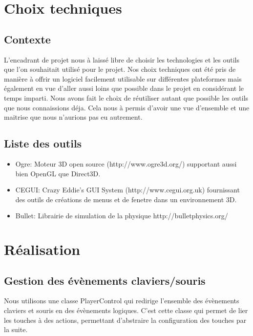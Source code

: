 \documentclass[frenchb,twoside]{EPURapport}
\begin{document}
    
    
\chapter{Choix techniques}
    \section{Contexte}
    L'encadrant de projet nous à laissé libre de choisir les technologies et
    les outils que l'on souhaitait utilisé pour le projet. Nos choix techniques
    ont été pris de manière à offrir un logiciel facilement utilisable sur
    différentes plateformes mais également en vue d'aller aussi loins que
    possible dans le projet en considérant le temps imparti. Nous avons fait le
    choix de réutiliser autant que possible les outils que nous connaissions
    déja. Cela nous à permis d'avoir une vue d'ensemble et une maitrise que
    nous n'aurions pas eu autrement.

    \section{Liste des outils}
    \begin{itemize}
        \item Ogre: Moteur 3D open source (http://www.ogre3d.org/) supportant aussi bien OpenGL que Direct3D. 
        \item CEGUI: Crazy Eddie's GUI System (http://www.cegui.org.uk) fournissant des outils de créations de menus et de fenetre dans un environnement 3D.
        \item Bullet: Librairie de simulation de la physique http://bulletphysics.org/
    \end{itemize}

\chapter{Réalisation}
    \section{Gestion des évènements claviers/souris}
        Nous utilisons une classe PlayerControl qui redirige l'ensemble des
        évènements claviers et souris en des évènements logiques. C'est cette
        classe qui permet de lier les touches à des actions, permettant
        d'abstraire la configuration des touches par la suite.
\end{document}

